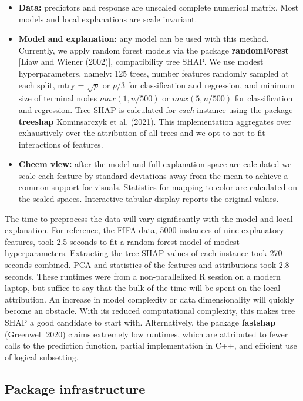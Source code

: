 \documentclass[
]{article}
\begin{document}
\begin{itemize}
    \item \textbf{Data:} predictors and response are unscaled complete numerical matrix. Most models and local explanations are scale invariant.
    \item \textbf{Model and explanation:} any model can be used with this method. Currently, we apply random forest models via the package \textbf{randomForest} [Liaw and Wiener (2002)], compatibility tree SHAP. We use modest hyperparameters, namely: 125 trees, number features randomly sampled at each split, mtry = $\sqrt{p}$ or $p/3$ for classification and regression, and minimum size of terminal nodes $max(1, n/500)$ or $max(5, n/500)$ for classification and regression. Tree SHAP is calculated for \emph{each} instance using the package \textbf{treeshap} Kominsarczyk et al. (2021). This implementation aggregates over exhaustively over the attribution of all trees and we opt to not to fit interactions of features. 
    \item \textbf{Cheem view:} after the model and full explanation space are calculated we scale each feature by standard deviations away from the mean to achieve a common support for visuals. Statistics for mapping to color are calculated on the scaled spaces. Interactive tabular display reports the original values.
\end{itemize}

The time to preprocess the data will vary significantly with the model and local explanation. For reference, the FIFA data, 5000 instances of nine explanatory features, took 2.5 seconds to fit a random forest model of modest hyperparameters. Extracting the tree SHAP values of each instance took 270 seconds combined. PCA and statistics of the features and attributions took 2.8 seconds. These runtimes were from a non-parallelized R session on a modern laptop, but suffice to say that the bulk of the time will be spent on the local attribution. An increase in model complexity or data dimensionality will quickly become an obstacle. With its reduced computational complexity, this makes tree SHAP a good candidate to start with. Alternatively, the package \textbf{fastshap} (Greenwell 2020) claims extremely low runtimes, which are attributed to fewer calls to the prediction function, partial implementation in C++, and efficient use of logical subsetting.

\hypertarget{sec:infrastructure}{%
\subsection{Package infrastructure}\label{sec:infrastructure}}
\end{document}
